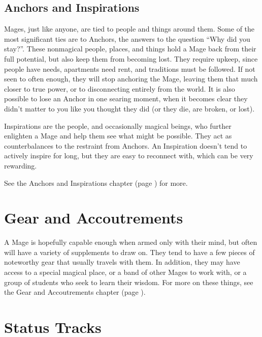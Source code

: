 \documentclass[
]{memoir}
\begin{document}
\hypertarget{anchors-and-inspirations}{%
\subsection{Anchors and Inspirations}\label{anchors-and-inspirations}}

Mages, just like anyone, are tied to people and things around them. Some
of the most significant ties are to Anchors, the answers to the question
``Why did you stay?''. These nonmagical people, places, and things hold
a Mage back from their full potential, but also keep them from becoming
lost. They require upkeep, since people have needs, apartments need
rent, and traditions must be followed. If not seen to often enough, they
will stop anchoring the Mage, leaving them that much closer to true
power, or to disconnecting entirely from the world. It is also possible
to lose an Anchor in one searing moment, when it becomes clear they
didn't matter to you like you thought they did (or they die, are broken,
or lost).

Inspirations are the people, and occasionally magical beings, who
further enlighten a Mage and help them see what might be possible. They
act as counterbalances to the restraint from Anchors. An Inspiration
doesn't tend to actively inspire for long, but they are easy to
reconnect with, which can be very rewarding.

See the Anchors and Inspirations chapter (page \pageref{Anchors and Inspirations chapter}) for more.

\hypertarget{gear-and-accoutrements}{%
\section{Gear and Accoutrements}\label{gear-and-accoutrements}}

A Mage is hopefully capable enough when armed only with their mind, but often will have a variety of supplements to draw on. They tend to have a few pieces of noteworthy gear that usually travels with them. In addition, they may have access to a special magical place, or a band of other Mages to work with, or a group of students who seek to learn their wisdom. For more on these things, see the Gear and Accoutrements chapter (page \pageref{Gear and Accoutrements chapter}).

\hypertarget{status-tracks}{%
\section{Status Tracks}\label{status-tracks}}
\end{document}
